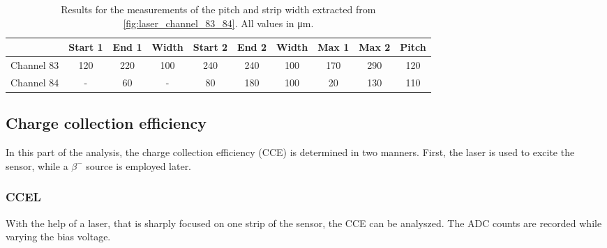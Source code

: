 \begin{table}
    \centering
    \caption{Results for the measurements of the pitch and strip width extracted from \autoref{fig:laser_channel_83_84}. All values in \unit{\micro\metre}.}
    \label{tab:pitch_width}
    \begin{tabular}{l | c c | c || c c | c || c c | c}
      \toprule
      {} & {Start 1} & {End 1} & {Width} & {Start 2} & {End 2} & {Width} & {Max 1} & {Max 2} & {Pitch} \\
      \midrule
      {Channel 83} & 120 & 220 & 100    & 240 & 240 & 100   & 170 & 290 & 120 \\ 
      {Channel 84} &  -  &  60 &  -     &  80 & 180 & 100   &  20 & 130 & 110 \\
      \bottomrule
    \end{tabular}
  \end{table}


\subsection{Charge collection efficiency}
In this part of the analysis, the charge collection efficiency (CCE) is determined in two manners. First, the laser is used to excite the sensor, while a $\beta^-$ 
source is employed later.

\subsubsection{CCEL}
With the help of a laser, that is sharply focused on one strip of the sensor, the CCE can be analyszed. The ADC counts are recorded while varying the bias voltage. 

